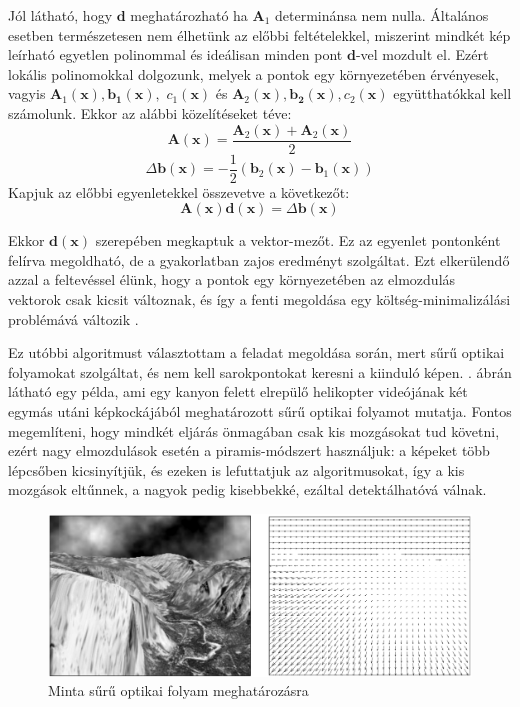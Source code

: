 Jól látható, hogy $\mathbf{d}$ meghatározható ha $\mathbf{A}_1$ determinánsa nem nulla. Általános esetben természetesen nem élhetünk az előbbi feltételekkel, miszerint mindkét kép leírható egyetlen polinommal és ideálisan minden pont $\mathbf{d}$-vel mozdult el. Ezért lokális polinomokkal dolgozunk, melyek a pontok egy környezetében érvényesek, vagyis $\mathbf{A}_1(\mathbf{x}), \mathbf{b_1}(\mathbf{x}),$ $c_1(\mathbf{x})$ és $\mathbf{A}_2(\mathbf{x}), \mathbf{b_2}(\mathbf{x}), c_2(\mathbf{x})$ együtthatókkal kell számolunk. Ekkor az alábbi közelítéseket téve:
\[\mathbf{A}(\mathbf{x}) = \frac{\mathbf{A}_2(\mathbf{x}) + \mathbf{A}_2(\mathbf{x})}{2}\]
\[\Delta \mathbf{b}(\mathbf{x}) = -\frac{1}{2}\left(\mathbf{b}_2(\mathbf{x})-\mathbf{b}_1(\mathbf{x})\right)\]
Kapjuk az előbbi egyenletekkel összevetve a következőt:
\[\mathbf{A}(\mathbf{x})\mathbf{d}(\mathbf{x}) = \Delta \mathbf{b}(\mathbf{x})\]

Ekkor $\mathbf{d}(\mathbf{x})$ szerepében megkaptuk a vektor-mezőt. Ez az egyenlet pontonként felírva megoldható, de a gyakorlatban zajos eredményt szolgáltat. Ezt elkerülendő azzal a feltevéssel élünk, hogy a pontok egy környezetében az elmozdulás vektorok csak kicsit változnak, és így a fenti megoldása egy költség-minimalizálási problémává változik \cite{farneback}.

Ez utóbbi algoritmust \cite{opencv-lk} választottam a feladat megoldása során, mert sűrű optikai folyamokat szolgáltat, és nem kell sarokpontokat keresni a kiinduló képen. . ábrán látható egy példa, ami egy kanyon felett elrepülő helikopter videójának két egymás utáni képkockájából meghatározott sűrű optikai folyamot mutatja. Fontos megemlíteni, hogy mindkét eljárás önmagában csak kis mozgásokat tud követni, ezért nagy elmozdulások esetén a piramis-módszert használjuk: a képeket több lépcsőben kicsinyítjük, és ezeken is lefuttatjuk az algoritmusokat, így a kis mozgások eltűnnek, a nagyok pedig kisebbekké, ezáltal detektálhatóvá válnak.

\begin{figure}[tbh]
\centering
\includegraphics[width=420pt]{figures/farneback.png}
\caption{Minta sűrű optikai folyam meghatározásra \cite{farneback} \label{fig:dense-of}}
\end{figure}

